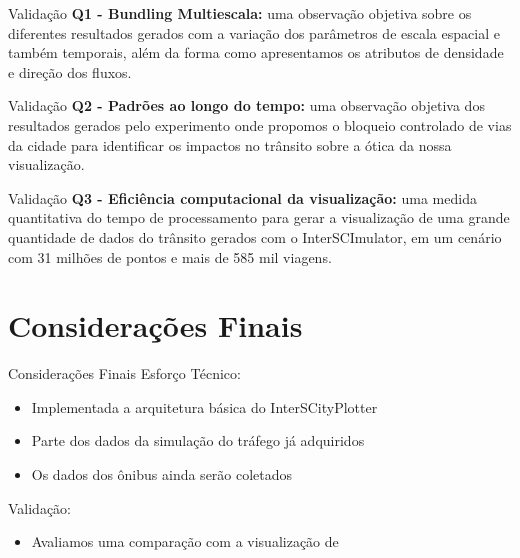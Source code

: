 \begin{frame}{Validação}
	\textbf{Q1 - Bundling Multiescala:} uma observação objetiva sobre os
diferentes resultados gerados com a variação dos parâmetros de escala espacial
e também temporais, além da forma como apresentamos os atributos de densidade e
direção dos fluxos.
\end{frame}

\begin{frame}{Validação}
	\textbf{Q2 - Padrões ao longo do tempo:} uma observação objetiva dos
resultados gerados pelo experimento onde propomos o bloqueio controlado de vias
da cidade para identificar os impactos no trânsito sobre a ótica da nossa
visualização.
\end{frame}

\begin{frame}{Validação}
	\textbf{Q3 - Eficiência computacional da visualização:} uma medida
quantitativa do tempo de processamento para gerar a visualização de uma grande
quantidade de dados do trânsito gerados com o InterSCImulator, em um cenário
com 31 milhões de pontos e mais de 585 mil viagens.	
\end{frame}

\section{Considerações Finais}

\begin{frame}{Considerações Finais}
	Esforço Técnico:
	\begin{itemize}
		\item Implementada a arquitetura básica do InterSCityPlotter
		\item Parte dos dados da simulação do tráfego já adquiridos
		\item Os dados dos ônibus ainda serão coletados
	\end{itemize}

	Validação:
	\begin{itemize}
		\item Avaliamos uma comparação com a visualização de \citet{Guo2011}
	\end{itemize}
\end{frame}

